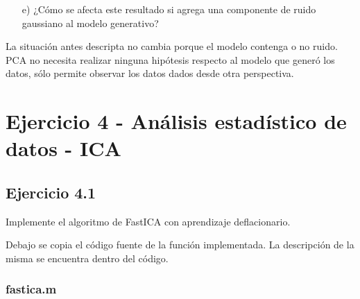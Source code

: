 \documentclass[11pt,a4paper,final]{article}
\begin{document}
\begin{enumerate}
   \item[e)] ¿Cómo se afecta este resultado si agrega una componente de ruido gaussiano al modelo generativo?
\end{enumerate}

La situación antes descripta no cambia porque el modelo contenga o no ruido. PCA no necesita realizar ninguna hipótesis respecto al modelo que generó los datos, sólo permite observar los datos dados desde otra perspectiva.



\clearpage




\section{Ejercicio 4 - Análisis estadístico de datos - ICA}

\subsection{Ejercicio 4.1}


Implemente el algoritmo de FastICA con aprendizaje deflacionario.


Debajo se copia el código fuente de la función implementada. La descripción de la misma se encuentra dentro del código.


\subsubsection*{fastica.m}
\end{document}
